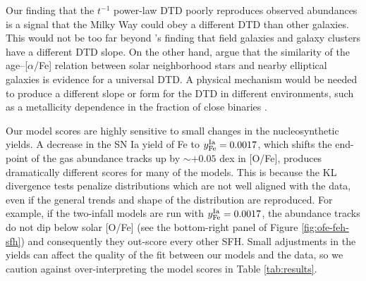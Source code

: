 \documentclass[twocolumn,twocolappendix,linenumbers]{aastex631}
\newcommand{\aFe}{[$\alpha$/Fe]\xspace}
\begin{document}

Our finding that the $t^{-1}$ power-law DTD poorly reproduces observed abundances is a signal that the Milky Way could obey a different DTD than other galaxies. This would not be too far beyond \citet{Maoz2017-CosmicDTD}'s finding that field galaxies and galaxy clusters have a different DTD slope. On the other hand, \citet{Walcher2016-SelfSimilarity} argue that the similarity of the age--\aFe relation between solar neighborhood stars and nearby elliptical galaxies is evidence for a universal DTD. A physical mechanism would be needed to produce a different slope or form for the DTD in different environments, such as a metallicity dependence in the fraction of close binaries \citep[e.g.,][]{Moe2019-CloseBinaryFraction}.

Our model scores are highly sensitive to small changes in the nucleosynthetic yields. A decrease in the SN Ia yield of Fe to $y_{\rm Fe}^{\rm Ia}=0.0017$, which shifts the end-point of the gas abundance tracks up by $\sim+0.05$ dex in [O/Fe], produces dramatically different scores for many of the models. This is because the KL divergence tests penalize distributions which are not well aligned with the data, even if the general trends and shape of the distribution are reproduced. For example, if the two-infall models are run with $y_{\rm Fe}^{\rm Ia}=0.0017$, the abundance tracks do not dip below solar [O/Fe] (see the bottom-right panel of Figure \ref{fig:ofe-feh-sfh}) and consequently they out-score every other SFH. Small adjustments in the yields can affect the quality of the fit between our models and the data, so we caution against over-interpreting the model scores in Table \ref{tab:results}.
\end{document}

